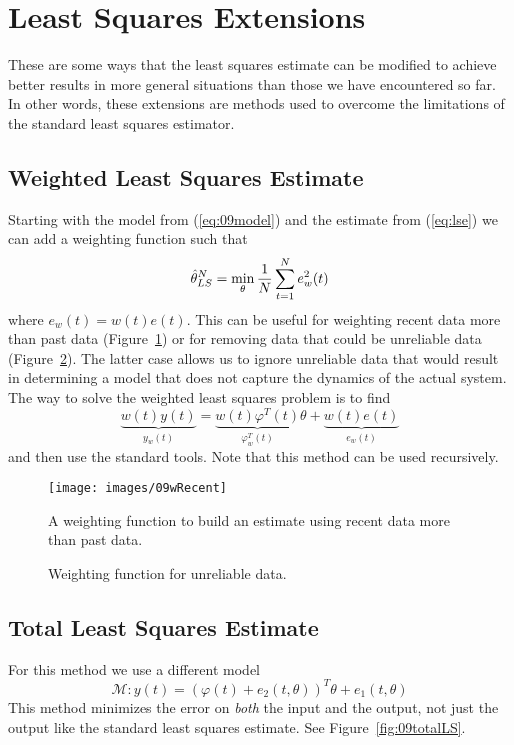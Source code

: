 \section{Least Squares Extensions}
These are some ways that the least squares estimate can be modified to achieve better results in more general situations than those we have encountered so far.
In other words, these extensions are methods used to overcome the limitations of the standard least squares estimator.

\subsection{Weighted Least Squares Estimate}
Starting with the model from (\ref{eq:09model}) and the estimate from (\ref{eq:lse}) we can add a weighting function such that
$$\hat{\theta}_{LS}^N = \min_\theta \frac{1}{N}\sum_{t=1}^N e_w^2(t)$$
where $e_w(t)=w(t)e(t)$.
This can be useful for weighting recent data more than past data (Figure~\ref{fig:09wRecent}) or for removing data that could be unreliable data (Figure~\ref{fig:09bad}).
The latter case allows us to ignore unreliable data that would result in determining a model that does not capture the dynamics of the actual system.
The way to solve the weighted least squares problem is to find
$$\underbrace{w(t)y(t)}_{y_w(t)} = \underbrace{w(t)\varphi^T(t)}_{\varphi_w^T(t)}\theta + \underbrace{w(t)e(t)}_{e_w(t)}$$
and then use the standard tools.
Note that this method can be used recursively.

\begin{figure}[ht!]
\centering
\texttt{[image: images/09wRecent]}
\caption{A weighting function to build an estimate using recent data more than past data.}
\label{fig:09wRecent}
\end{figure}

\begin{figure}[ht!]
\centering
{} \hfill
{} \hfill
\caption{Weighting function for unreliable data.}
\label{fig:09bad}
\end{figure}

\subsection{Total Least Squares Estimate}
For this method we use a different model
$$\mathcal{M}: y(t) = {(\varphi(t)+e_2(t,\theta))}^T\theta+e_1(t,\theta)$$
This method minimizes the error on \textit{both} the input and the output, not just the output like the standard least squares estimate.
See Figure~\ref{fig:09totalLS}.

